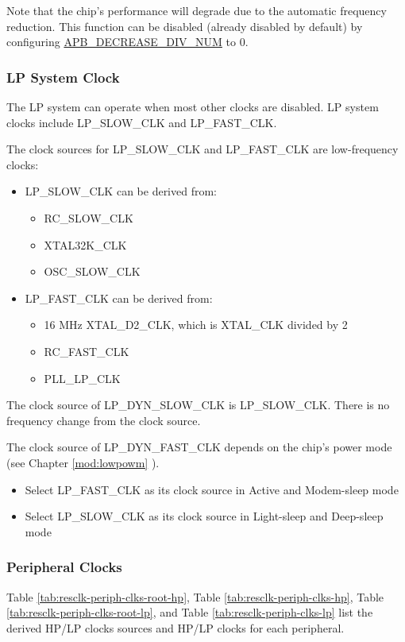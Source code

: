 \documentclass[main\_\_EN.tex]{subfiles}
\begin{document}
Note that the chip's performance will degrade due to the automatic frequency reduction. This function can be disabled (already disabled by default) by configuring \hyperref[fielddesc:PCRAPBDECREASEDIVNUM]{APB\_DECREASE\_DIV\_NUM} to 0.

\subsubsection{LP System Clock}

The LP system can operate when most other clocks are disabled. LP system clocks include LP\_SLOW\_CLK and LP\_FAST\_CLK.

The clock sources for LP\_SLOW\_CLK and LP\_FAST\_CLK are low-frequency clocks:
\begin{itemize}
    \item LP\_SLOW\_CLK can be derived from:
    \begin{itemize}
        \item RC\_SLOW\_CLK
        \item XTAL32K\_CLK
        \item OSC\_SLOW\_CLK
    \end{itemize}
    \item LP\_FAST\_CLK can be derived from:
    \begin{itemize}
        \item 16 MHz XTAL\_D2\_CLK, which is XTAL\_CLK divided by 2
        \item RC\_FAST\_CLK
        \item PLL\_LP\_CLK
    \end{itemize}
\end{itemize}

The clock source of LP\_DYN\_SLOW\_CLK is LP\_SLOW\_CLK. There is no frequency change from the clock source.

The clock source of LP\_DYN\_FAST\_CLK depends on the chip's power mode (see Chapter \ref{mod:lowpowm} \textit{}).
\begin{itemize}
    \item Select LP\_FAST\_CLK as its clock source in Active and Modem-sleep mode
    \item Select LP\_SLOW\_CLK as its clock source in Light-sleep and Deep-sleep mode
\end{itemize}

\subsubsection{Peripheral Clocks}
Table \ref{tab:resclk-periph-clks-root-hp}, Table \ref{tab:resclk-periph-clks-hp}, Table \ref{tab:resclk-periph-clks-root-lp}, and Table \ref{tab:resclk-periph-clks-lp} list the derived HP/LP clocks sources and HP/LP clocks for each peripheral.
\end{document}
